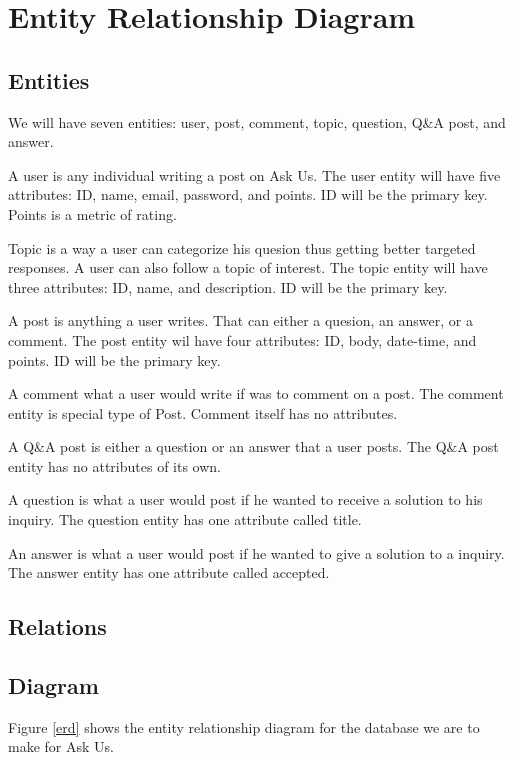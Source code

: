 \section{Entity Relationship Diagram}
\subsection{Entities}
We will have seven entities: user, post, comment, topic, question, Q\&A post, and answer.

A user is any individual writing a post on Ask Us. The user entity will have five attributes: ID, name, email, password, and points. ID will be the primary key. Points is a metric of rating.

Topic is a way a user can categorize his quesion thus getting better targeted responses. A user can also follow a topic of interest. The topic entity will have three attributes: ID, name, and description. ID will be the primary key.

A post is anything a user writes. That can either a quesion, an answer, or a comment. The post entity wil have four attributes: ID, body, date-time, and points. ID will be the primary key.

A comment what a user would write if was to comment on a post. The comment entity is special type of Post. Comment itself has no attributes.

A Q\&A post is either a question or an answer that a user posts. The Q\&A post entity has no attributes of its own.

A question is what a user would post if he wanted to receive a solution to his inquiry. The question entity has one attribute called title.

An answer is what a user would post if he wanted to give a solution to a inquiry. The answer entity has one attribute called accepted.

\subsection{Relations}

\subsection{Diagram}

Figure \ref{erd} shows the entity relationship diagram for the database we are to make for Ask Us.

